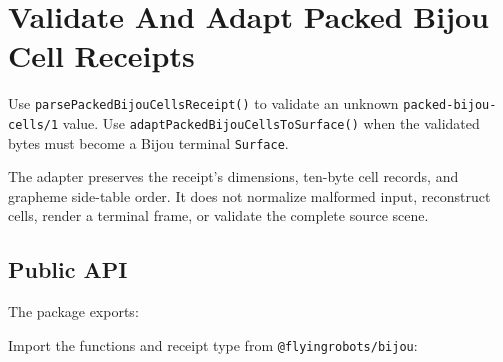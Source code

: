\chapter{Validate And Adapt Packed Bijou Cell Receipts}\label{record-022}

\smallskip

Use \texttt{p\allowbreak{}a\allowbreak{}r\allowbreak{}s\allowbreak{}e\allowbreak{}P\allowbreak{}a\allowbreak{}c\allowbreak{}k\allowbreak{}e\allowbreak{}d\allowbreak{}B\allowbreak{}i\allowbreak{}j\allowbreak{}o\allowbreak{}u\allowbreak{}C\allowbreak{}e\allowbreak{}l\allowbreak{}l\allowbreak{}s\allowbreak{}R\allowbreak{}e\allowbreak{}c\allowbreak{}e\allowbreak{}i\allowbreak{}p\allowbreak{}t\allowbreak{}(\allowbreak{})} to validate an unknown \texttt{p\allowbreak{}a\allowbreak{}c\allowbreak{}k\allowbreak{}e\allowbreak{}d\allowbreak{}-\allowbreak{}b\allowbreak{}i\allowbreak{}j\allowbreak{}o\allowbreak{}u\allowbreak{}-\allowbreak{}c\allowbreak{}e\allowbreak{}l\allowbreak{}l\allowbreak{}s\allowbreak{}/\allowbreak{}1} value. Use \texttt{a\allowbreak{}d\allowbreak{}a\allowbreak{}p\allowbreak{}t\allowbreak{}P\allowbreak{}a\allowbreak{}c\allowbreak{}k\allowbreak{}e\allowbreak{}d\allowbreak{}B\allowbreak{}i\allowbreak{}j\allowbreak{}o\allowbreak{}u\allowbreak{}C\allowbreak{}e\allowbreak{}l\allowbreak{}l\allowbreak{}s\allowbreak{}T\allowbreak{}o\allowbreak{}S\allowbreak{}u\allowbreak{}r\allowbreak{}f\allowbreak{}a\allowbreak{}c\allowbreak{}e\allowbreak{}(\allowbreak{})} when the validated bytes must become a Bijou terminal \texttt{S\allowbreak{}u\allowbreak{}r\allowbreak{}f\allowbreak{}a\allowbreak{}c\allowbreak{}e}.

The adapter preserves the receipt's dimensions, ten-byte cell records, and grapheme side-table order. It does not normalize malformed input, reconstruct cells, render a terminal frame, or validate the complete source scene.

\section{Public API}\label{record-022-public-api}

The package exports:



Import the functions and receipt type from \texttt{@\allowbreak{}f\allowbreak{}l\allowbreak{}y\allowbreak{}i\allowbreak{}n\allowbreak{}g\allowbreak{}r\allowbreak{}o\allowbreak{}b\allowbreak{}o\allowbreak{}t\allowbreak{}s\allowbreak{}/\allowbreak{}b\allowbreak{}i\allowbreak{}j\allowbreak{}o\allowbreak{}u}:

